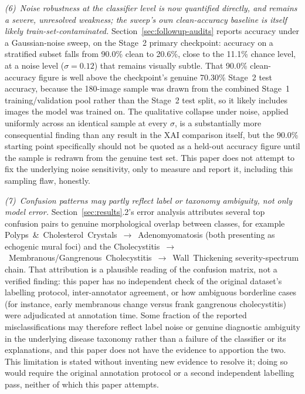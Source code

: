 \textit{(6)~Noise robustness at the classifier level is now quantified directly, and remains a severe, unresolved weakness; the sweep's own clean-accuracy baseline is itself likely train-set-contaminated.} Section~\ref{sec:followup-audits} reports accuracy under a Gaussian-noise sweep, on the Stage~2 primary checkpoint: accuracy on a stratified subset falls from 90.0\% clean to 20.6\%, close to the 11.1\% chance level, at a noise level ($\sigma=0.12$) that remains visually subtle. That 90.0\% clean-accuracy figure is well above the checkpoint's genuine 70.30\% Stage~2 test accuracy, because the 180-image sample was drawn from the combined Stage~1 training/validation pool rather than the Stage~2 test split, so it likely includes images the model was trained on. The qualitative collapse under noise, applied uniformly across an identical sample at every $\sigma$, is a substantially more consequential finding than any result in the XAI comparison itself, but the 90.0\% starting point specifically should not be quoted as a held-out accuracy figure until the sample is redrawn from the genuine test set. This paper does not attempt to fix the underlying noise sensitivity, only to measure and report it, including this sampling flaw, honestly.

\textit{(7)~Confusion patterns may partly reflect label or taxonomy ambiguity, not only model error.} Section~\ref{sec:results}.2's error analysis attributes several top confusion pairs to genuine morphological overlap between classes, for example Polyps~\&~Cholesterol~Crystals~$\rightarrow$~Adenomyomatosis (both presenting as echogenic mural foci) and the Cholecystitis~$\rightarrow$~Membranous/Gangrenous~Cholecystitis~$\rightarrow$~Wall~Thickening severity-spectrum chain. That attribution is a plausible reading of the confusion matrix, not a verified finding: this paper has no independent check of the original dataset's labelling protocol, inter-annotator agreement, or how ambiguous borderline cases (for instance, early membranous change versus frank gangrenous cholecystitis) were adjudicated at annotation time. Some fraction of the reported misclassifications may therefore reflect label noise or genuine diagnostic ambiguity in the underlying disease taxonomy rather than a failure of the classifier or its explanations, and this paper does not have the evidence to apportion the two. This limitation is stated without inventing new evidence to resolve it; doing so would require the original annotation protocol or a second independent labelling pass, neither of which this paper attempts.

